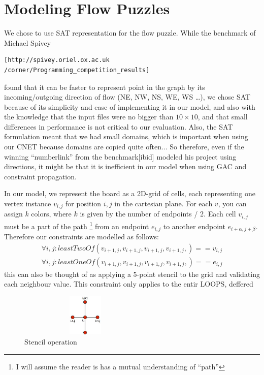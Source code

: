 \documentclass[journal]{IEEEtran}
\begin{document}
\section*{Modeling Flow Puzzles}
We chose to use SAT representation for the flow puzzle. 
While the benchmark of Michael Spivey 
\small\begin{verbatim}
[http://spivey.oriel.ox.ac.uk
/corner/Programming_competition_results]\end{verbatim}
\normalsize
found that it can be faster to represent point in the graph by its
incoming/outgoing direction of flow (NE, NW, NS, WE, WS \dots), 
we chose SAT because of its simplicity and ease of implementing it in our
model, and also with the knowledge that the input files were no bigger than
$10 \times 10$, and that small differences in performance is not critical to our evaluation.
Also, the SAT formulation meant that we had small domains, which is important
when using our CNET because domains are copied quite often... So therefore, 
even if the winning ``numberlink'' from the benchmark[ibid] modeled 
his project using directions, it might be that it is inefficient in 
our model when using GAC and constraint propagation.

In our model, we represent the board as a 2D-grid of cells, each representing one
vertex instance $v_{i,j}$ for position $i,j$ in the cartesian plane.
For each $v$, you can assign $k$ colors, where $k$ is given by
the number of endpoints / 2. 
Each cell $v_{i,j}$ must be a part of the path
\footnote{I will assume the reader is has a mutual understanding of ``path''}
from an endpoint $e_{i,j}$ to another endpoint $e_{i+\alpha,j+\beta}$.
Therefore our constraints are modelled as follows:
\begin{align}
    \forall{i,j}: leastTwoOf( v_{i+1,j},v_{i+1,j},v_{i+1,j},v_{i+1,j}, ) == v_{i,j} \\   %
    \forall{i,j}: leastOneOf( v_{i+1,j},v_{i+1,j},v_{i+1,j},v_{i+1,j}, ) == e_{i,j}
\end{align}
this can also be thought of as applying a 5-point stencil to the grid
and validating each neighbour value. This constraint only applies to the entir
LOOPS, deffered

\begin{figure}[Hb]
\centering
    \includegraphics[height=2cm,keepaspectratio,width=2.5in]{stencil.jpg}
\caption{Stencil operation}
\label{fig:stencil}
\end{figure}
\end{document}

